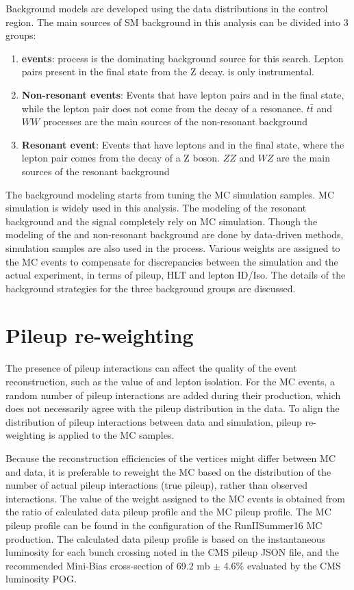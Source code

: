Background models are developed using the data distributions in the control region. The main sources of SM background in this analysis can be divided into 3 groups:
\begin{enumerate}
\item \textbf{\Zjets events}: \Zjets process is the dominating background source for this search. Lepton pairs present in the final state from the Z decay. \ptmiss is only instrumental.
\item \textbf{Non-resonant events}: Events that have lepton pairs and \ptmiss in the final state, while the lepton pair does not come from the decay of a resonance. $t\bar{t}$ and $WW$ processes are the main sources of the non-resonant background
\item \textbf{Resonant event}: Events that have leptons and \ptmiss in the final state, where the lepton pair comes from the decay of a Z boson. $ZZ$ and $WZ$ are the main sources of the resonant background
\end{enumerate}

\vspace{0.3cm}
The background modeling starts from tuning the MC simulation samples. MC simulation is widely used in this analysis. The modeling of the resonant background and the signal completely rely on MC simulation. Though the modeling of the \Zjets and non-resonant background are done by data-driven methods, simulation samples are also used in the process. Various weights are assigned to the MC events to compensate for discrepancies between the simulation and the actual experiment, in terms of pileup, HLT and lepton ID/Iso. The details of the background strategies for the three background groups are discussed.

\section{Pileup re-weighting}
The presence of pileup interactions can affect the quality of the event reconstruction, such as the value of \ptmiss and lepton isolation. For the MC events, a random number of pileup interactions are added during their production, which does not necessarily agree with the pileup distribution in the data. To align the distribution of pileup interactions between data and simulation, pileup re-weighting is applied to the MC samples. 

\vspace{0.3cm}
Because the reconstruction efficiencies of the vertices might differ between MC and data, it is preferable to reweight the MC based on the distribution of the number of actual pileup interactions (true pileup), rather than observed interactions. The value of the weight assigned to the MC events is obtained from the ratio of calculated data pileup profile and the MC pileup profile. The MC pileup profile can be found in the configuration of the RunIISummer16 MC production. The calculated data pileup profile is based on the instantaneous luminosity for each bunch crossing noted in the CMS pileup JSON file, and the recommended Mini-Bias cross-section of 69.2 mb $\pm$ 4.6\% evaluated by the CMS luminosity POG.

